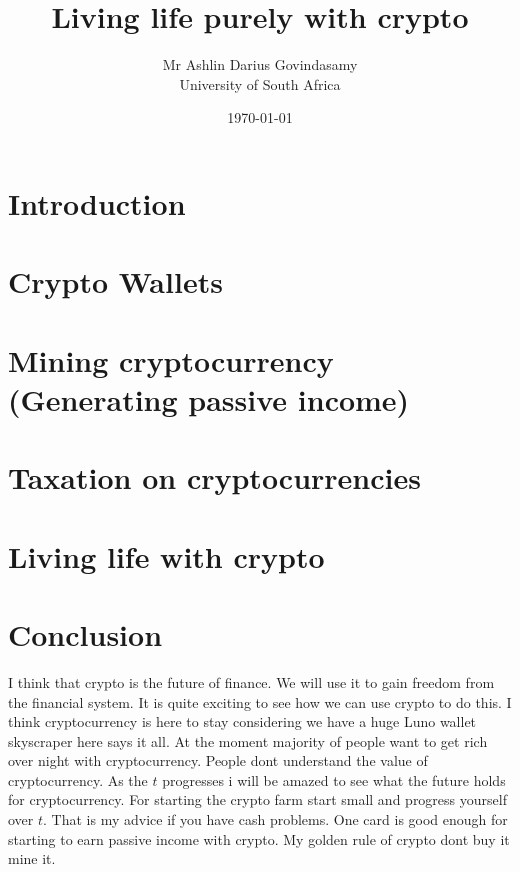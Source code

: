 \documentclass{report}
\title{Living life purely with crypto}
\author{Mr Ashlin Darius Govindasamy\\ \large{University of South Africa}}
\date{\today}
\begin{document}
\maketitle
\newpage

\tableofcontents
{} 

\chapter*{Introduction}


\chapter{Crypto Wallets}


\chapter{Mining cryptocurrency (Generating passive income)}


\chapter{Taxation on cryptocurrencies}


\chapter{Living life with crypto}


\chapter*{Conclusion}
I think that crypto is the future of finance. We will use it to gain freedom from the financial system. It is quite exciting to see how we can use crypto to do this. I think cryptocurrency is here to stay considering we have a huge Luno wallet skyscraper here says it all.
At the moment majority of people want to get rich over night with cryptocurrency. People dont understand the value of cryptocurrency. As the $t$ progresses i will be amazed to see what the future holds for cryptocurrency. For starting the crypto farm start small and progress yourself over $t$. That is my advice if you have cash problems. One card is good enough for starting to earn passive income with crypto. My golden rule of crypto dont buy it mine it.

\newpage
\end{document}

